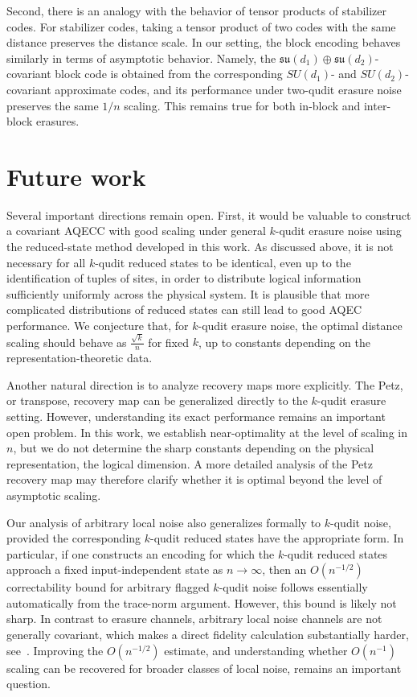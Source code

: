 \documentclass[10pt,twocolumn,superscriptaddress,aps,amsmath,amssymb,citeautoscript,floatfix,prx,longbibliography]{revtex4-2}
\theoremstyle{plain}
\theoremstyle{plain}
\theoremstyle{plain}
\theoremstyle{plain}
\theoremstyle{plain}
\theoremstyle{plain}
\begin{document}
Second, there is an analogy with the behavior of tensor products of stabilizer codes. For stabilizer codes, taking a tensor product of two codes with the same distance preserves the distance scale. In our setting, the block encoding behaves similarly in terms of asymptotic behavior. Namely, the
\(\mathfrak{su}(d_1)\oplus\mathfrak{su}(d_2)\)-covariant block code is obtained from the corresponding \(SU(d_1)\)- and \(SU(d_2)\)-covariant approximate codes, and its performance under two-qudit erasure noise preserves the same \(1/n\)
scaling. This remains true for both in-block and inter-block erasures.

\section{Future work}\label{sec:main_future_work}

Several important directions remain open.
First, it would be valuable to construct a covariant AQECC with good scaling under general \(k\)-qudit erasure noise using the reduced-state method developed in this work. As discussed above, it is not necessary for all \(k\)-qudit reduced states to be identical, even up to the identification of tuples of sites, in order to distribute logical information sufficiently uniformly across the physical system. It is plausible that more complicated distributions of reduced states can still lead to good AQEC performance. We conjecture that, for \(k\)-qudit erasure noise, the optimal distance scaling should behave as
$
    \frac{\sqrt{k}}{n}
$
for fixed \(k\), up to constants depending on the representation-theoretic data.

Another natural direction is to analyze recovery maps more explicitly. The Petz, or transpose, recovery map can be generalized directly to the \(k\)-qudit erasure setting. However, understanding its exact performance remains an important open problem. In this work, we establish near-optimality at the level of scaling in \(n\), but we do not determine the sharp constants depending on the physical representation, the logical dimension. A more detailed analysis of the Petz recovery map may therefore clarify whether it is optimal beyond the level of asymptotic scaling.

Our analysis of arbitrary local noise also generalizes formally to \(k\)-qudit noise, provided the corresponding \(k\)-qudit reduced states have the appropriate form. In particular, if one constructs an encoding for which the \(k\)-qudit reduced states approach a fixed input-independent state as \(n\to\infty\), then an \(O(n^{-1/2})\) correctability bound for arbitrary flagged \(k\)-qudit noise follows essentially automatically from the trace-norm argument. However, this bound is likely not sharp. In contrast to erasure channels, arbitrary local noise channels are not generally covariant, which makes a direct fidelity calculation substantially harder, see~\cite{Alexander2025, Zhou2021}. Improving the \(O(n^{-1/2})\) estimate, and understanding whether \(O(n^{-1})\) scaling can be recovered for broader classes of local noise, remains an important question.
\end{document}
